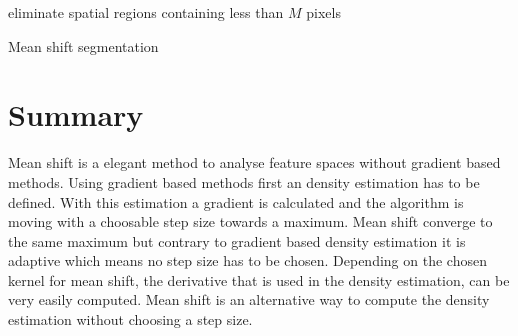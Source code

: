 \newcommand{\mycapfn}[1]{\color{black} #1}

\begin{algorithm2e}[H]
	\DontPrintSemicolon
	\BlankLine
	

	\BlankLine
	
	\BlankLine
	\BlankLine
	
	\BlankLine
	eliminate spatial regions containing less than $M$ pixels\;
	\BlankLine
	
	\caption{Mean shift segmentation}
	\label{alg:mss}
\end{algorithm2e}

\section{Summary} %
\label{sec:summary_meanshift}

Mean shift is a elegant method to analyse feature spaces without gradient based
methods. Using gradient based methods first an density estimation has to be defined.
With this estimation a gradient is calculated and the algorithm is moving with
a choosable step size towards a maximum. Mean shift converge to the same maximum 
but contrary to gradient based density estimation it is adaptive which means 
no step size has to be chosen. Depending on the chosen kernel for mean shift,
the derivative that is used in the density estimation, can be very easily 
computed. Mean shift is an alternative way to compute the density estimation
without choosing a step size. 




